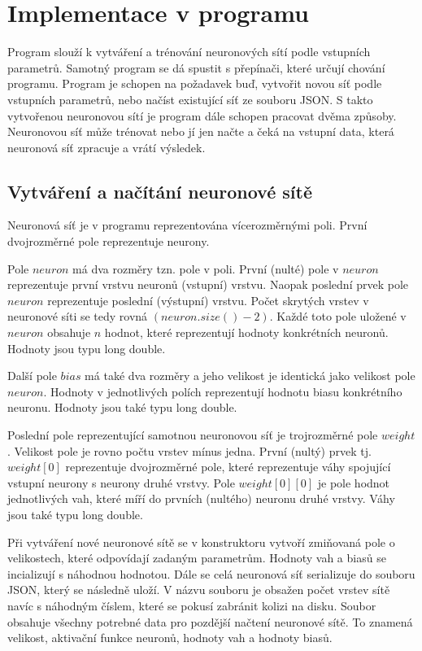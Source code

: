 \section{Implementace v programu}
Program slouží k vytváření a trénování neuronových sítí podle vstupních parametrů.
Samotný program se dá spustit s přepínači, které určují chování programu.
Program je schopen na požadavek buď, vytvořit novou síť podle vstupních parametrů, nebo načíst existující síť ze souboru JSON.
S takto vytvořenou neuronovou sítí je program dále schopen pracovat dvěma způsoby.
Neuronovou síť může trénovat nebo jí jen načte a čeká na vstupní data, která neuronová síť zpracuje a vrátí výsledek.

\subsection{Vytváření a načítání neuronové sítě}
Neuronová síť je v programu reprezentována vícerozměrnými poli. První dvojrozměrné pole reprezentuje neurony.

Pole \(neuron\) má dva rozměry tzn. pole v poli.
První (nulté) pole v \(neuron\) reprezentuje první vrstvu neuronů (vstupní) vrstvu.
Naopak poslední prvek pole \(neuron\) reprezentuje poslední (výstupní) vrstvu.
Počet skrytých vrstev v neuronové síti se tedy rovná \((neuron.size() - 2)\).
Každé toto pole uložené v \(neuron\) obsahuje \(n\) hodnot, které reprezentují hodnoty konkrétních neuronů. Hodnoty jsou typu long double.

Další pole \(bias\) má také dva rozměry a jeho velikost je identická jako velikost pole \(neuron\).
Hodnoty v jednotlivých polích reprezentují hodnotu biasu konkrétního neuronu. Hodnoty jsou také typu long double.

Poslední pole reprezentující samotnou neuronovou síť je trojrozměrné pole \(weight\). Velikost pole je rovno počtu vrstev mínus jedna.
První (nultý) prvek tj. \(weight[0]\) reprezentuje dvojrozměrné pole, které reprezentuje váhy spojující vstupní neurony s neurony druhé vrstvy.
Pole \(weight[0][0]\) je pole hodnot jednotlivých vah, které míří do prvních (nultého) neuronu druhé vrstvy. Váhy jsou také typu long double.

Při vytváření nové neuronové sítě se v konstruktoru vytvoří zmiňovaná pole o velikostech, které odpovídají zadaným parametrům.
Hodnoty vah a biasů se incializují s náhodnou hodnotou. Dále se celá neuronová síť serializuje do souboru JSON, který se následně uloží.
V názvu souboru je obsažen počet vrstev sítě navíc s náhodným číslem, které se pokusí zabránit kolizi na disku.
Soubor obsahuje všechny potrebné data pro pozdější načtení neuronové sítě.
To znamená velikost, aktivační funkce neuronů, hodnoty vah a hodnoty biasů.

